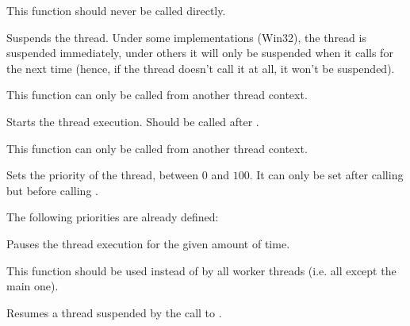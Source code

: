 This function should never be called directly.


\label{wxthreadpause}


Suspends the thread. Under some implementations (Win32), the thread is
suspended immediately, under others it will only be suspended when it calls
 for the next time (hence, if the
thread doesn't call it at all, it won't be suspended).

This function can only be called from another thread context.


\label{wxthreadrun}


Starts the thread execution. Should be called after
.

This function can only be called from another thread context.


\label{wxthreadsetpriority}


Sets the priority of the thread, between $0$ and $100$. It can only be set
after calling  but before calling
.

The following priorities are already defined:

\twocolwidtha{7cm}
\begin{twocollist}\itemsep=0pt
\end{twocollist}


\label{wxthreadsleep}


Pauses the thread execution for the given amount of time.

This function should be used instead of  by all worker
threads (i.e. all except the main one).


\label{wxthreadresume}


Resumes a thread suspended by the call to .

